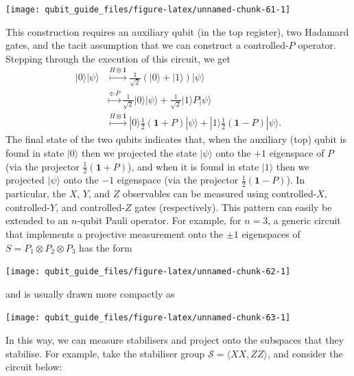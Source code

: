 \documentclass[fleqn,a4paper]{article}
\theoremstyle{definition}
\theoremstyle{definition}
\theoremstyle{definition}
\theoremstyle{definition}
\theoremstyle{remark}
\begin{document}
\begin{center}\texttt{[image: qubit\_guide\_files/figure-latex/unnamed-chunk-61-1]} \end{center}

This construction requires an auxiliary qubit (in the top register), two Hadamard gates, and the tacit assumption that we can construct a controlled-\(P\) operator.
Stepping through the execution of this circuit, we get
\[
  \begin{aligned}
    |0\rangle|\psi\rangle
    &\overset{H\otimes\mathbf{1}}{\longmapsto}
      \frac{1}{\sqrt{2}}(|0\rangle+|1\rangle)|\psi\rangle
  \\&\overset{\texttt{c-}P}{\longmapsto}
      \frac{1}{\sqrt{2}}|0\rangle|\psi\rangle + \frac{1}{\sqrt{2}}|1\rangle P|\psi\rangle
  \\&\overset{H\otimes\mathbf{1}}{\longmapsto}
      |0\rangle\frac{1}{2}(\mathbf{1}+P)|\psi\rangle + |1\rangle\frac{1}{2}(\mathbf{1}-P)|\psi\rangle.
  \end{aligned}
\]
The final state of the two qubits indicates that, when the auxiliary (top) qubit is found in state \(|0\rangle\) then we projected the state \(|\psi\rangle\) onto the \(+1\) eigenspace of \(P\) (via the projector \(\frac{1}{2}(\mathbf{1}+P)\)), and when it is found in state \(|1\rangle\) then we projected \(|\psi\rangle\) onto the \(-1\) eigenspace (via the projector \(\frac{1}{2}(\mathbf{1}-P)\)).
In particular, the \(X\), \(Y\), and \(Z\) observables can be measured using controlled-\(X\), controlled-\(Y\), and controlled-\(Z\) gates (respectively).
This pattern can easily be extended to an \(n\)-qubit Pauli operator.
For example, for \(n=3\), a generic circuit that implements a projective measurement onto the \(\pm1\) eigenspaces of \(S=P_1\otimes P_2\otimes P_3\) has the form

\begin{center}\texttt{[image: qubit\_guide\_files/figure-latex/unnamed-chunk-62-1]} \end{center}

and is usually drawn more compactly as

\begin{center}\texttt{[image: qubit\_guide\_files/figure-latex/unnamed-chunk-63-1]} \end{center}

In this way, we can measure stabilisers and project onto the subspaces that they stabilise.
For example, take the stabiliser group \(\mathcal{S}=\langle XX,ZZ\rangle\), and consider the circuit below:
\end{document}
